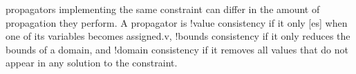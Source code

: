 \Glspl{propagator} implementing the same \gls{constraint} can differ in the
amount of propagation they perform.
%
A \gls{propagator} is \glshyphened!{value consistency} if it only
[es] when one of its \glspl{variable} becomes
\gls{assigned.v}, \glshyphened!{bounds consistency} if it only reduces the
bounds of a \gls{domain}, and \glshyphened!{domain consistency} if it removes
all values that do not appear in any \gls{solution} to the \gls{constraint}.
%
\begin{table}
  \centering%
  \figureFont\figureFontSize%
\end{table}
